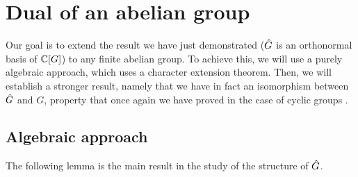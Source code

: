 \section{Dual of an abelian group}
\label{sect1-dual-abelien-group}

Our goal is to extend the result we have just demonstrated ($\hat{G}$ is an orthonormal basis of $\mathbb{C}[G]$) to any finite abelian group. To achieve this, we will use a purely algebraic approach, which uses a character extension theorem. Then, we will establish a stronger result, namely that we have in fact an isomorphism between $\hat{G}$ and $G$, property that once again we have proved in the case of cyclic groups .
\subsection{Algebraic approach}
\label{sec2-approach-algebraic-dual-abelien}

The following lemma is the main result in the study of the structure of $\hat{G}$.

